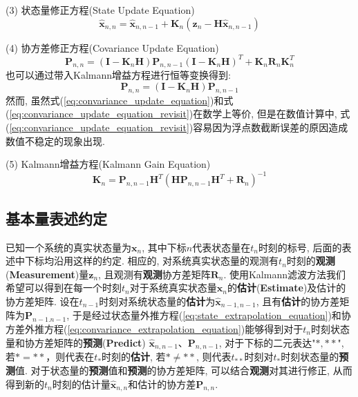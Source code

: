 \documentclass[12pt]{article}
\begin{document}
(3) 状态量修正方程(State Update Equation)
\begin{equation} \label{eq:state_update_equation}
\hat{\bm{x}}_{n,n} = \hat{\bm{x}}_{n,n-1}+\bm{K}_n (\bm{z}_n - \bm{H}\hat{\bm{x}}_{n,n-1})
\end{equation}

(4) 协方差修正方程(Covariance Update Equation)
\begin{equation} \label{eq:convariance_update_equation}
\bm{P}_{n,n} = (\bm{I} - \bm{K}_n \bm{H}) \bm{P}_{n,n-1} (\bm{I} - \bm{K}_n \bm{H})^T + \bm{K}_n \bm{R}_n \bm{K}_n^T
\end{equation}
也可以通过带入Kalmann增益方程进行恒等变换得到:
\begin{equation} \label{eq:convariance_update_equation_revisit}
\bm{P}_{n,n} = (\bm{I} - \bm{K}_n \bm{H}) \bm{P}_{n,n-1}
\end{equation}
然而, 虽然式(\ref{eq:convariance_update_equation})和式(\ref{eq:convariance_update_equation_revisit})在数学上等价, 但是在数值计算中, 式(\ref{eq:convariance_update_equation_revisit})容易因为浮点数截断误差的原因造成数值不稳定的现象出现.

(5) Kalmann增益方程(Kalmann Gain Equation)
\begin{equation} \label{eq:kalmann_gain_equation}
\bm{K}_n = \bm{P}_{n,n-1}\bm{H}^T(\bm{H}\bm{P}_{n,n-1}\bm{H}^T + \bm{R}_n)^{-1}
\end{equation}

\subsection{基本量表述约定}

已知一个系统的真实状态量为$\bm{x}_n$, 其中下标$n$代表状态量在$t_n$时刻的标号, 后面的表述中下标均沿用这样的约定. 相应的, 对系统真实状态量的观测有$t_n$时刻的\textbf{观测}(\textbf{Measurement})量$\bm{z}_n$, 且观测有\textbf{观测}协方差矩阵$\bm{R}_n$. 使用Kalmann滤波方法我们希望可以得到在每一个时刻$t_n$对于系统真实状态量$\bm{x}_n$的\textbf{估计}(\textbf{Estimate})及估计的协方差矩阵. 设在$t_{n-1}$时刻对系统状态量的\textbf{估计}为$\hat{\bm{x}}_{n-1,n-1}$, 且有\textbf{估计}的协方差矩阵为$\bm{P}_{n-1.n-1}$, 于是经过状态量外推方程(\ref{eq:state_extrapolation_equation})和协方差外推方程(\ref{eq:convariance_extrapolation_equation})能够得到对于$t_n$时刻状态量和协方差矩阵的\textbf{预测}(\textbf{Predict}) $\hat{\bm{x}}_{n,n-1}$、$\bm{P}_{n,n-1}$, 对于下标的二元表达"$*,**$", 若$*=**$，则代表在$t_*$时刻的\textbf{估计}, 若$* \neq **$, 则代表$t_{**}$时刻对$t_*$时刻状态量的\textbf{预测}值. 对于状态量的\textbf{预测}值和\textbf{预测}的协方差矩阵, 可以结合\textbf{观测}对其进行修正, 从而得到新的$t_n$时刻的估计量$\hat{\bm{x}}_{n,n}$和估计的协方差$\bm{P}_{n,n}$. 
\end{document}
